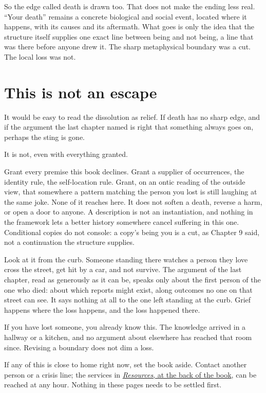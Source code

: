 So the edge called death is drawn too. That does not make the ending less real. ``Your death'' remains a concrete biological and social event, located where it happens, with its causes and its aftermath. What goes is only the idea that the structure itself supplies one exact line between being and not being, a line that was there before anyone drew it. The sharp metaphysical boundary was a cut. The local loss was not.

\section*{This is not an escape}

It would be easy to read the dissolution as relief. If death has no sharp edge, and if the argument the last chapter named is right that something always goes on, perhaps the sting is gone.

It is not, even with everything granted.

Grant every premise this book declines. Grant a supplier of occurrences, the identity rule, the self-location rule. Grant, on an ontic reading of the outside view, that somewhere a pattern matching the person you lost is still laughing at the same joke. None of it reaches here. It does not soften a death, reverse a harm, or open a door to anyone. A description is not an instantiation, and nothing in the framework lets a better history somewhere cancel suffering in this one. Conditional copies do not console: a copy's being you is a cut, as Chapter 9 said, not a continuation the structure supplies.

Look at it from the curb. Someone standing there watches a person they love cross the street, get hit by a car, and not survive. The argument of the last chapter, read as generously as it can be, speaks only about the first person of the one who died: about which reports might exist, along outcomes no one on that street can see. It says nothing at all to the one left standing at the curb. Grief happens where the loss happens, and the loss happened there.

If you have lost someone, you already know this. The knowledge arrived in a hallway or a kitchen, and no argument about elsewhere has reached that room since. Revising a boundary does not dim a loss.

If any of this is close to home right now, set the book aside. Contact another person or a crisis line; the services in \hyperref[resources]{\textit{Resources}, at the back of the book}, can be reached at any hour. Nothing in these pages needs to be settled first.

